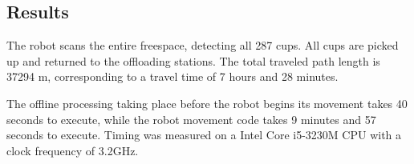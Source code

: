 \subsection{Results}
The robot scans the entire freespace, detecting all 287 cups.
All cups are picked up and returned to the offloading stations.
The total traveled path length is 37294 m, corresponding to a travel time of 7 hours and 28 minutes.


The offline processing taking place before the robot begins its movement takes 
40 seconds to execute, while the robot movement code takes 
9 minutes and 57 seconds to execute. %
Timing was measured on a Intel Core i5-3230M CPU with a clock frequency of 3.2GHz.



